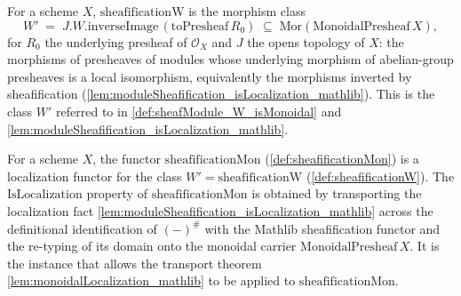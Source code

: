 \begin{definition}\leanok
  \label{def:sheafificationW}
  For a scheme \(X\), \(\mathrm{sheafificationW}\) is the morphism class
  \[
    W' \;=\; J.W.\mathrm{inverseImage}\,(\mathrm{toPresheaf}\,R_0)
      \;\subseteq\; \mathrm{Mor}(\mathrm{MonoidalPresheaf}\,X),
  \]
  for \(R_0\) the underlying presheaf of \(\mathcal{O}_X\) and \(J\) the opens
  topology of \(X\): the morphisms of presheaves of modules whose underlying
  morphism of abelian-group presheaves is a local isomorphism, equivalently the
  morphisms inverted by sheafification
  (\cref{lem:moduleSheafification_isLocalization_mathlib}). This is the class
  \(W'\) referred to in \cref{def:sheafModule_W_isMonoidal} and
  \cref{lem:moduleSheafification_isLocalization_mathlib}.
\end{definition}

\begin{lemma}\leanok
  \label{def:sheafificationMon_isLocalization}
  For a scheme \(X\), the functor \(\mathrm{sheafificationMon}\)
  (\cref{def:sheafificationMon}) is a localization functor for the class
  \(W' = \mathrm{sheafificationW}\) (\cref{def:sheafificationW}). The
  \(\mathrm{IsLocalization}\) property of \(\mathrm{sheafificationMon}\) is
  obtained by transporting the localization fact
  \cref{lem:moduleSheafification_isLocalization_mathlib} across the definitional
  identification of \((-)^{\#}\) with the Mathlib sheafification functor and the
  re-typing of its domain onto the monoidal carrier \(\mathrm{MonoidalPresheaf}\,X\).
  It is the instance that allows the transport theorem
  \cref{lem:monoidalLocalization_mathlib} to be applied to
  \(\mathrm{sheafificationMon}\).
\end{lemma}

